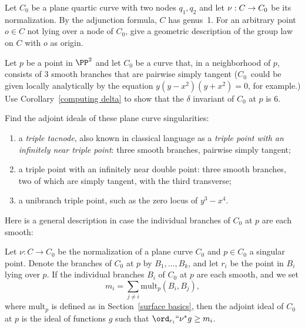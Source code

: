 \begin{exercise}
Let $C_0$ be a
plane quartic curve
%
%
with two nodes $q_1, q_2$
and
let $\nu :\nobreak C \to C_0$ be its normalization.
%
By the adjunction formula, $C$ has genus~1.
For an arbitrary point
$o \in C$ not
lying over a node of $C_0$,
 give a geometric description
of the
group law
%
on $C$ with $o$ as origin.
\end{exercise}

\begin{exercise}
Let $p$ be a point in $\PP^{2}$ and let $C_{0}$ be a curve that, in
a neighborhood of $p$, consists of 3 smooth branches that are
pairwise simply tangent ($C_{0}$~could be given locally analytically
by the equation $y(y-x^{2})(y+x^{2})=0$, for example.) Use
Corollary~\ref{computing delta} to show that the $\delta$ invariant
of $C_{0}$ at $p$ is 6.
\end{exercise}

\begin{exercise}
Find the
adjoint ideals
%
of these plane curve singularities:
\begin{enumerate}
\item a
\emph{triple tacnode},
also known in classical language as
a \emph{triple point with an}
\emph{infinitely near triple point}:
%
three smooth branches, pairwise simply
%
%
tangent;
\item a triple point with an infinitely near double point: three smooth
branches, two of which are simply tangent, with the third transverse;
\item a
unibranch triple point,
such as the zero locus of $y^3-x^4$.
%
%
\end{enumerate}\label{tnih15.7}
\end{exercise}

Here is a  general description in case the individual branches of $C_0$
at $p$ are each smooth:

\begin{exercise}
Let $\nu : C \to C_0$ be the normalization of a plane curve $C_0$ and
%
$p \in C_0$ a singular point. Denote the branches of $C_0$ at $p$ by
$B_1,\dots,B_k$, and let $r_i$ be the point in $B_i$ lying over $p$. If
the individual branches $B_i$ of $C_0$ at $p$ are each smooth, and we set
$$
m_i = \sum_{j \neq i} \mathrm{mult}_p(B_i,  B_j),
$$
where $\mathrm{mult}_{p}$ is defined as in Section~\ref{surface basics}, then the adjoint ideal of $C_0$ at $p$ is the ideal of functions $g$
such that $\ord_{r_i}` `\nu^*g \geq m_i$.
\end{exercise}



